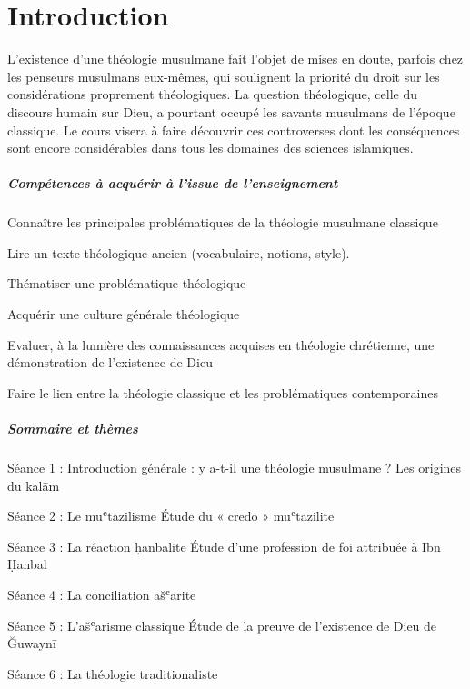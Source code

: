 \chapter{Introduction}




L’existence d’une théologie musulmane fait l’objet de mises en doute, parfois chez les penseurs musulmans eux-mêmes, qui soulignent la priorité du droit sur les considérations proprement théologiques. La question théologique, celle du discours humain sur Dieu, a pourtant occupé les savants musulmans de l’époque classique. Le cours visera à faire découvrir ces controverses dont les conséquences sont encore considérables dans tous les domaines des sciences islamiques.


\paragraph{Compétences à acquérir à l’issue de l’enseignement}
\bi
\item Connaître les principales problématiques de la théologie musulmane classique
\item Lire un texte théologique ancien (vocabulaire, notions, style).
\item Thématiser une problématique théologique
\item Acquérir une culture générale théologique
\item Evaluer, à la lumière des connaissances acquises en théologie chrétienne, une démonstration de l’existence de Dieu
\item Faire le lien entre la théologie classique et les problématiques contemporaines
\ei
\paragraph{Sommaire et thèmes}

\bi 
\item Séance 1 : Introduction générale : y a-t-il une théologie musulmane ? 
Les origines du kalām
\item Séance 2 : Le muʿtazilisme
Étude du « credo » muʿtazilite
\item Séance 3 : La réaction ḥanbalite
		Étude d’une profession de foi attribuée à Ibn Ḥanbal
\item Séance 4 : La conciliation ašʿarite
\item Séance 5 : L’ašʿarisme classique 
Étude de la preuve de l’existence de Dieu de Ğuwaynī
\item Séance 6 : La théologie traditionaliste
\ei

